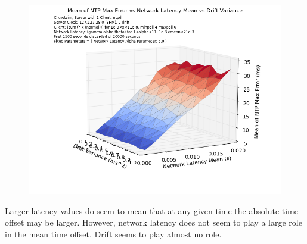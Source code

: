 \begin{figure}[h]
  \caption{}
  \label{fig:mean-mean-var-drift}
  \includegraphics[width=0.8\linewidth]{mean_max_err-mean_latency-drift_variance.png}
\end{figure}


Larger latency values do seem to mean that at any given time the
absolute time offset may be larger. However, network latency does not
seem to play a large role in the mean time offset. Drift seems to play
almost no role.







